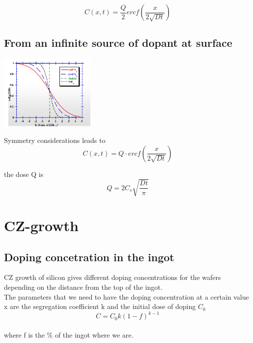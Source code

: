 \begin{equation}
C(x,t)=\frac{Q}{2}ercf\left(\frac{x}{2\sqrt{Dt}}\right)
\end{equation}


\subsection{From an infinite source of dopant at surface}

\centering
\includegraphics[width=0.35\textwidth]{inf_surf.png}\\
\raggedright

Symmetry considerations leads to 
\begin{equation}
C(x,t)=Q\cdot ercf\left(\frac{x}{2\sqrt{Dt}}\right)
\end{equation}

the dose Q is 
\begin{equation}
Q=2C_s \sqrt{\frac{Dt}{\pi}}
\end{equation}



\section{CZ-growth}

\subsection{Doping concetration in the ingot}

CZ growth of silicon gives different doping concentrations for the wafers depending on the distance from the top of the ingot.\\
The parameters that we need to have the doping concentration at a certain value x are the segregation coefficient k and the initial dose of doping $C_0$
\begin{equation}
C=C_0 k (1-f)^{k-1}
\end{equation}
\\
where f is the \% of the ingot where we are.

